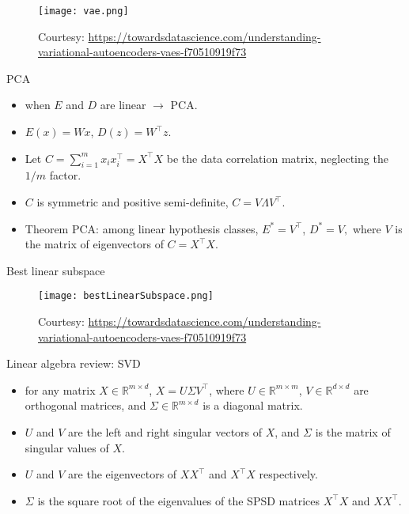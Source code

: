 \documentclass[final]{beamer}
\begin{document}
\begin{frame}
\begin{figure}
	\texttt{[image: vae.png]}
	\caption{Courtesy: \url{https://towardsdatascience.com/understanding-variational-autoencoders-vaes-f70510919f73}}
\end{figure}
\end{frame}
\begin{frame}{PCA}
	\begin{itemize}
	\item when $E$ and $D$ are linear $\to$ PCA.
	\pause 
	\item $E(x) = Wx$, $D(z) = W^\top z$.
	\pause
\item Let $C = \sum_{i=1}^m x_i x_i^\top = X^\top X$ be the data correlation matrix, neglecting the $1/m$ factor.
	\pause 
	\item $C$ is symmetric and positive semi-definite, $C = V \Lambda V^\top$.
	\item Theorem PCA: among linear hypothesis classes, $E^* = V^\top$, $D^* = V,$ where $V$ is the matrix of eigenvectors of $C = X^\top X$.
	\end{itemize}
\end{frame}
\begin{frame}{Best linear subspace}
	\begin{figure}
	\texttt{[image: bestLinearSubspace.png]}
	\caption{Courtesy: \url{https://towardsdatascience.com/understanding-variational-autoencoders-vaes-f70510919f73}}

	\end{figure}
\end{frame}
\begin{frame}{Linear algebra review: SVD}
	\begin{itemize}
		\item for any matrix $X \in \mathbb{R}^{m\times d}$, $X = U \Sigma V^\top$, where $U \in \mathbb{R}^{m\times m}$, $V \in \mathbb{R}^{d\times d}$ are orthogonal matrices, and $\Sigma \in \mathbb{R}^{m\times d}$ is a diagonal matrix.
		\pause
		\item $U$ and $V$ are the left and right singular vectors of $X$, and $\Sigma$ is the matrix of singular values of $X$.
		\pause
		\item $U$ and $V$ are the eigenvectors of $XX^\top$ and $X^\top X$ respectively.
		\pause
		\item $\Sigma$ is the square root of the eigenvalues of the SPSD matrices $X^\top X$ and $XX^\top$.
		

	\end{itemize}
\end{frame}
\end{document}
